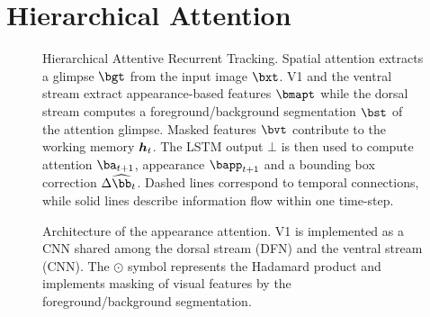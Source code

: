 \section{Hierarchical Attention}
\label{sec:att}


	\begin{figure}[ht]
		\centering
	 	\usebox{\systemfig}
	 	\vspace{-2.5em}
	 	\caption{Hierarchical Attentive Recurrent Tracking. Spatial attention extracts a glimpse $\bgt$ from the input image $\bxt$. V1 and the ventral stream extract appearance-based features $\bmapt$ while the dorsal stream computes a foreground/background segmentation $\bst$ of the attention glimpse. Masked features $\bvt$ contribute to the working memory $\B{h}_t$. The LSTM output $\bot$ is then used to compute attention $\ba_{t+1}$, appearance $\bapp_{t+1}$ and a bounding box correction $\Delta \widehat{\bb}_t$. Dashed lines correspond to temporal connections, while solid lines describe information flow within one time-step.}
		\label{fig:system}
		\vspace{-.5em}
	\end{figure}
	
    \begin{figure}
      \begin{minipage}[c]{0.3\textwidth}
        \usebox{\archfig}
      \end{minipage}\hfill
      \begin{minipage}[c]{0.6\textwidth}
        \caption{Architecture of the appearance attention. V1 is implemented as a CNN shared among the dorsal stream (DFN) and the ventral stream (CNN). The $\odot$ symbol represents the Hadamard product and implements masking of visual features by the foreground/background segmentation.}
    	\label{fig:arch}
      \end{minipage}
      \vspace{-1.5em}
    \end{figure}


